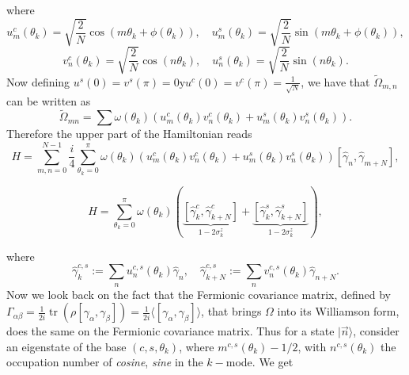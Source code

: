 where
\begin{equation}
u_{m}^{c}\left(\theta_{k}\right)=\sqrt{\frac{2}{N}} \cos \left(m \theta_{k}+\phi\left(\theta_{k}\right)\right), \quad u_{m}^{s}\left(\theta_{k}\right)=\sqrt{\frac{2}{N}} \sin \left(m \theta_{k}+\phi\left(\theta_{k}\right)\right),
\end{equation}
\begin{equation}
v_{n}^{c}\left(\theta_{k}\right)=\sqrt{\frac{2}{N}} \cos \left(n \theta_{k}\right), \quad u_{n}^{s}\left(\theta_{k}\right)=\sqrt{\frac{2}{N}} \sin \left(n \theta_{k}\right).
\end{equation}
Now defining $
u^{s}(0)=v^{s}(\pi)=0 \mathrm{y} u^{c}(0)=v^{c}(\pi)=\frac{1}{\sqrt{N}}$, we have that $\tilde{\Omega}_{m,n}$ can be written as
\begin{equation}
\tilde{\Omega}_{m n}=\sum \omega\left(\theta_{k}\right)\left(u_{m}^{c}\left(\theta_{k}\right) v_{n}^{c}\left(\theta_{k}\right)+u_{m}^{s}\left(\theta_{k}\right) v_{n}^{s}\left(\theta_{k}\right)\right).
\end{equation}
Therefore the upper part of the Hamiltonian reads
\begin{equation}
H=\sum_{m, n=0}^{N-1} \frac{i}{4} \sum_{\theta_{k}=0}^{\pi} \omega\left(\theta_{k}\right)\left(u_{m}^{c}\left(\theta_{k}\right) v_{n}^{c}\left(\theta_{k}\right)+u_{m}^{s}\left(\theta_{k}\right) v_{n}^{s}\left(\theta_{k}\right)\right)\left[\hat{\gamma}_{n}, \hat{\gamma}_{m+N}\right],
\end{equation}

\begin{equation}
H=\sum_{\theta_{k}=0}^{\pi} \omega\left(\theta_{k}\right)(\underbrace{\left[\hat{\gamma}_{k}^{c}, \hat{\gamma}_{k+N}^{c}\right]}_{1-2\sigma^{z     }_k}+\underbrace{\left[\hat{\gamma}_{k}^{s}, \hat{\gamma}_{k+N}^{s}\right]}_{1-2\sigma^{z}_k}),
\end{equation}

where
\begin{equation}
\hat{\gamma}_{k}^{c, s}:=\sum_{n} u_{n}^{c, s}\left(\theta_{k}\right) \hat{\gamma}_{n}, \quad \hat{\gamma}_{k+N}^{c, s}:=\sum_{n} v_{n}^{c, s}\left(\theta_{k}\right) \hat{\gamma}_{n+N}.
\end{equation}
Now we look back on the fact that the Fermionic covariance matrix, defined by $
\Gamma_{\alpha \beta}=\frac{1}{2 i} \operatorname{tr}\left(\rho\left[\gamma_{\alpha}, \gamma_{\beta}\right]\right)=\frac{1}{2 i}\langle \left[\gamma_{\alpha}, \gamma_{\beta}\right] \rangle$, that brings $\Omega$ into its Williamson form, does the same on the Fermionic covariance matrix. Thus for a state $|\vec{n}\rangle$, consider an eigenstate of the base $(c,s,\theta_k)$, where $m^{c, s}\left(\theta_{k}\right)-1 / 2$, with $n^{c, s}\left(\theta_{k}\right)$ the occupation number of \textit{cosine}, \textit{sine} in the $k-$mode. We get 

